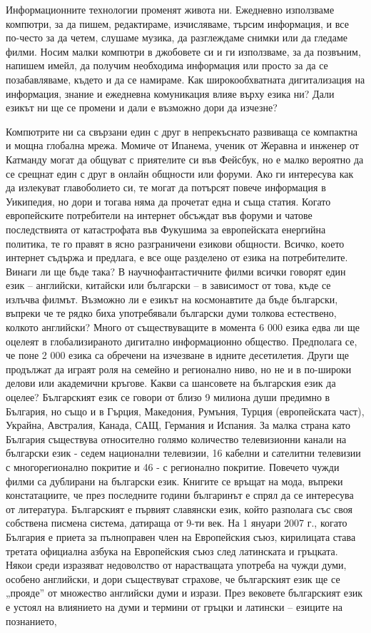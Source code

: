 \begin{multicols}{2}
  Информационните технологии променят живота ни. Ежедневно използваме компютри, за да пишем, редактираме, изчисляваме, търсим информация, и все по-често за да четем, слушаме музика, да разглеждаме снимки или да гледаме филми. Носим малки компютри в джобовете си и ги използваме, за да позвъним, напишем имейл, да получим необходима информация или просто за да се позабавляваме, където и да се намираме. Как широкообхватната дигитализация на информация, знание и ежедневна комуникация влияе върху езика ни? Дали езикът ни ще се промени и дали е възможно дори да изчезне?

  Компютрите ни са свързани един с друг в непрекъснато развиваща се компактна и мощна глобална мрежа. Момиче от Ипанема, ученик от Жеравна и инженер от Катманду могат да общуват с приятелите си във Фейсбук, но е малко вероятно да се срещнат един с друг в онлайн общности или форуми. Ако ги интересува как да излекуват главоболието си, те могат да потърсят повече информация в Уикипедия, но дори и тогава няма да прочетат една и съща статия. Когато европейските потребители на интернет обсъждат във форуми и чатове последствията от катастрофата във Фукушима за европейската енергийна политика, те го правят в ясно разграничени езикови общности. Всичко, което интернет съдържа и предлага, е все още разделено от езика на потребителите. Винаги ли ще бъде така?  В научнофантастичните филми всички говорят един език – английски, китайски или български – в зависимост от това, къде се излъчва филмът. Възможно ли е езикът на космонавтите да бъде български, въпреки че те рядко биха употребявали български думи толкова естествено, колкото английски? Много от съществуващите в момента 6 000 езика едва ли ще оцелеят в глобализираното дигитално информационно общество. Предполага се, че поне 2 000 езика са обречени на изчезване в идните десетилетия. Други ще продължат да играят роля на семейно и регионално ниво, но не и в по-широки делови или академични кръгове. Какви са шансовете на българския език да оцелее?  Българският език се говори от близо 9 милиона души предимно в България, но също и в Гърция, Македония, Румъния, Турция (европейската част), Украйна, Австралия, Канада, САЩ, Германия и Испания. За малка страна като България съществува относително голямо количество телевизионни канали на български език - седем национални телевизии, 16 кабелни и сателитни телевизии с многорегионално покритие и 46 - с регионално покритие.  Повечето чужди филми са дублирани на български език. Книгите се връщат на мода, въпреки констатациите, че през последните години българинът е спрял да се интересува от литература.  Българският е първият славянски език, който разполага със своя собствена писмена система, датираща от 9-ти век. На 1 януари 2007 г., когато България е приета за пълноправен член на Европейския съюз, кирилицата става третата официална азбука на Европейския съюз след латинската и гръцката.  Някои среди изразяват недоволство от нарастващата употреба на чужди думи, особено английски, и дори съществуват страхове, че българският език ще се „прояде” от множество английски думи и изрази. През вековете българският език е устоял на влиянието на думи и термини от гръцки и латински – езиците на познанието, 
\end{multicols}
